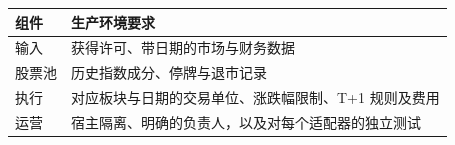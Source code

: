 \begin{tabular}{@{}P{3.0cm}P{9.5cm}@{}}
\toprule
\textbf{组件} & \textbf{生产环境要求} \\
\midrule
输入 & 获得许可、带日期的市场与财务数据 \\
股票池 & 历史指数成分、停牌与退市记录 \\
执行 & 对应板块与日期的交易单位、涨跌幅限制、T+1 规则及费用 \\
运营 & 宿主隔离、明确的负责人，以及对每个适配器的独立测试 \\
\bottomrule
\end{tabular}
